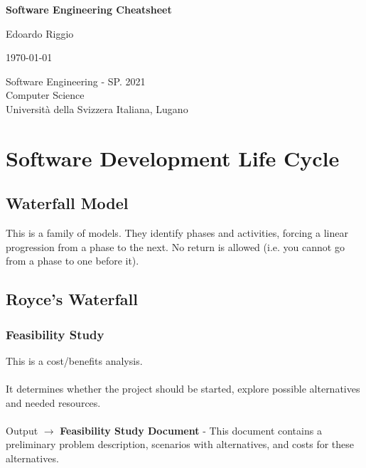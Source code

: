 \documentclass{article}
\begin{document}
\begin{titlepage}
    \begin{center}
        \vspace*{1cm}
        
        \Huge
        \textbf{Software Engineering Cheatsheet}
        
        \vspace{0.5cm}
        \LARGE
        
        \vspace{.5cm}
        
        Edoardo Riggio
   		  \vspace{1.5cm}
       
        \vfill
        
        \today
        
        \vspace{.8cm}
          \Large
          Software Engineering - SP. 2021 \\
        Computer Science\\
        Universit\`{a} della Svizzera Italiana, Lugano\\
        
    \end{center}
\end{titlepage}

\tableofcontents

\newpage

\section{Software Development Life Cycle}
\subsection{Waterfall Model}
This is a family of models. They identify phases and activities, forcing a linear progression from a phase to the next. No return is allowed (i.e. you cannot go from a phase to one before it).

\subsection{Royce's Waterfall}
\subsubsection{Feasibility Study}
This is a cost/benefits analysis. \\ \\
It determines whether the project should be started, explore possible alternatives and needed resources. \\ \\
Output $\rightarrow$ \textbf{Feasibility Study Document} - This document contains a preliminary problem description, scenarios with alternatives, and costs for these alternatives.
\end{document}
